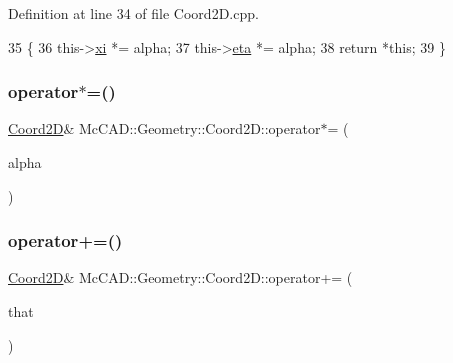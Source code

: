 Definition at line 34 of file Coord2\+D.\+cpp.


\begin{DoxyCode}
35                                 \{
36     this->\hyperlink{classMcCAD_1_1Geometry_1_1Coord2D_a5b99b9ce570b6bd792bd485fb2f305bb}{xi} *= alpha;
37     this->\hyperlink{classMcCAD_1_1Geometry_1_1Coord2D_afa71c0967f3d43fe50e61abd731c8f5e}{eta} *= alpha;
38     \textcolor{keywordflow}{return} *\textcolor{keyword}{this};
39 \}
\end{DoxyCode}
\mbox{\label{classMcCAD_1_1Geometry_1_1Coord2D_a55b64bd56f217b3bf2a100a75b9ef605}} 
\subsubsection{\texorpdfstring{operator$\ast$=()}{operator*=()}\hspace{0.1cm}{\footnotesize\ttfamily [2/2]}}
{\footnotesize\ttfamily \hyperlink{classMcCAD_1_1Geometry_1_1Coord2D}{Coord2D}\& Mc\+C\+A\+D\+::\+Geometry\+::\+Coord2\+D\+::operator$\ast$= (\begin{DoxyParamCaption}\item[{const \hyperlink{namespaceMcCAD_1_1Geometry_ac043b37a4a7e849fca22869e1982d2f8}{coord\+\_\+type} \&}]{alpha }\end{DoxyParamCaption})}

\mbox{\label{classMcCAD_1_1Geometry_1_1Coord2D_a690e8f85d1fa6b210a03b9b2d31102ed}} 
\subsubsection{\texorpdfstring{operator+=()}{operator+=()}\hspace{0.1cm}{\footnotesize\ttfamily [1/2]}}
{\footnotesize\ttfamily \hyperlink{classMcCAD_1_1Geometry_1_1Coord2D}{Coord2D}\& Mc\+C\+A\+D\+::\+Geometry\+::\+Coord2\+D\+::operator+= (\begin{DoxyParamCaption}\item[{const \hyperlink{classMcCAD_1_1Geometry_1_1Coord2D}{Coord2D} \&}]{that }\end{DoxyParamCaption})}

